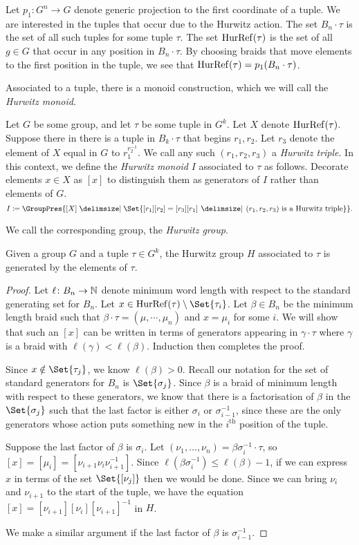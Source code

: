 Let $p_1 \colon G^n \to G$ denote generic projection to the first coordinate of a tuple.
We are interested in the tuples that occur due to the Hurwitz action.
The set $B_n \cdot \tau$ is the set of all such tuples for some tuple  $\tau$.
The set $\operatorname{HurRef}(\tau)$ is the set of all  $g \in G$ that occur in any position in  $B_n \cdot \tau$.
By choosing braids that move elements to the first position in the tuple, we see that $\operatorname{HurRef}(\tau) = p_1(B_n \cdot \tau)$.

Associated to a tuple, there is a monoid construction, which we will call the \emph{Hurwitz monoid}.
\begin{definition}
	Let $G$ be some group, and let $\tau$ be some tuple  in $G^k$.
	Let $X$ denote  $\operatorname{HurRef}(\tau)$.
	Suppose there in there is a tuple in  $B_k \cdot \tau$ that begins $r_1,r_2$.
	Let $r_3$ denote the element of $X$ equal in $G$ to  $r_1^{r_2^{-1}}$.
	We call any such $(r_1,r_2,r_3)$ a \emph{Hurwitz triple}.
	In this context, we define the \emph{Hurwitz monoid} $I$ associated to $\tau$ as follows.
	Decorate elements $x \in X$ as $[x]$ to distinguish them as generators of $I$ rather than elements of $G$.
	\[
		I \coloneq \GroupPres{[X] \relations \Set{ [r_1][r_2] = [r_3][r_1] \given (r_1,r_2,r_3) \text{ is a Hurwitz triple}}}
		.\]
\end{definition}
We call the corresponding group, the \emph{Hurwitz group}.
\begin{lemma}
	Given a group $G$ and a tuple $\tau \in G^k$, the Hurwitz group $H$ associated to $\tau$ is generated by the elements of $\tau$.
\end{lemma}
\begin{proof}
	Let $\ell \colon B_n \to \mathbb{N}$ denote minimum word length with respect to the standard generating set for $B_n$.
	Let $x \in \hurref(\tau) \setminus \Set{\tau_i}$.
	Let $\beta \in B_n$ be the minimum length braid such that $\beta \cdot \tau =(\mu,\cdots,\mu_n)$ and $x=\mu_i$ for some $i$.
	We will show that such an $[x]$ can be written in terms of generators appearing in $\gamma \cdot \tau$ where  $\gamma$ is a braid with $\ell(\gamma)<\ell(\beta)$.
	Induction then completes the proof.

	Since $x \notin \Set{\tau_j}$, we know $\ell(\beta)>0$.
	Recall our notation for the set of standard generators for $B_n$ is $\Set{\sigma_j}$.
	Since $\beta$ is a braid of minimum length with respect to these generators, we know that there is a factorisation of $\beta$ in the $\Set{\sigma_j} $ such that the last factor is either $\sigma_i$ or  $\sigma_{i-1}^{-1}$, since these are the only generators whose action puts something new in the $i^{\text{th}}$ position of the tuple.

	Suppose the last factor of $\beta$ is $\sigma_i$.
	Let $(\nu_1,\ldots,\nu_n) = \beta\sigma_i^{-1} \cdot \tau$, so $[x] = [\mu_i] = [\nu_{i+1}\nu_i\nu_{i+1}^{-1}]$.
	Since $\ell(\beta \sigma_i^{-1}) \leq \ell(\beta)-1$, if we can express $x$ in terms of the set $\Set{[\nu_j]}$ then we would be done.
	Since we can bring $\nu_i$ and  $\nu_{i+1}$ to the start of the tuple, we have the equation $[x]=[\nu_{i+1}][\nu_i][\nu_{i+1}]^{-1}$ in $H$.

	We make a similar argument if the last factor of $\beta$ is  $\sigma_{i-1}^{-1}$.
\end{proof}
